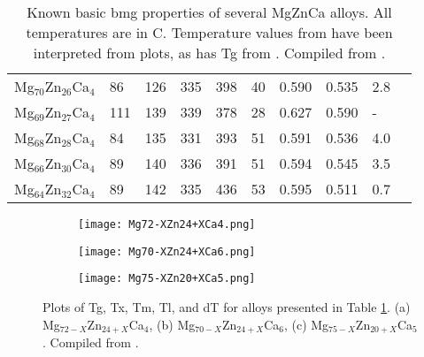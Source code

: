 \documentclass[a4paper,12pt,oneside]{report}%
\begin{document}
\begin{table}[h]
\begin{tabular}{ l l l l l l l l l l }
		Mg$_{70}$Zn$_{26}$Ca$_{4}$ & 86 & 126 & 335 & 398 & 40 & 0.590 & 0.535 & 2.8 & \cite{Cao2013, Cao2012} \\ 
		Mg$_{69}$Zn$_{27}$Ca$_{4}$ & 111 & 139 & 339 & 378 & 28 & 0.627 & 0.590 & - & \cite{Wang2013} \\ 
		Mg$_{68}$Zn$_{28}$Ca$_{4}$ & 84 & 135 & 331 & 393 & 51 & 0.591 & 0.536 & 4.0 & \cite{Cao2013, Cao2012} \\ 
		Mg$_{66}$Zn$_{30}$Ca$_{4}$ & 89 & 140 & 336 & 391 & 51 & 0.594 & 0.545 & 3.5 & \cite{Cao2013, Cao2012} \\ 
		Mg$_{64}$Zn$_{32}$Ca$_{4}$ & 89 & 142 & 335 & 436 & 53 & 0.595 & 0.511 & 0.7 & \cite{Cao2013, Cao2012} \\
		\bottomrule 
	\end{tabular}
	\caption[Known basic \acrshort{bmg} properties of several MgZnCa alloys. All temperatures are in \degree C.]{Known basic \acrshort{bmg} properties of several MgZnCa alloys. All temperatures are in \degree C. Temperature values from \cite{Gu2005} have been interpreted from plots, as has \acrshort{Tg} from \cite{Wang2013}. Compiled from \cite{Cao2013, Gu2005, Zhou2013, Cao2012, Wang2013}.}
	\label{tab:MgZnCaAlloys}
\end{table}

\begin{figure}[htb]
	\centering
	\begin{subfigure}[htbp]{0.49\textwidth}
		\texttt{[image: Mg72-XZn24+XCa4.png]}
		\caption{}
		\label{fig:Mg72xZn24xCa4}
	\end{subfigure}
	\begin{subfigure}[htbp]{0.49\textwidth}
		\texttt{[image: Mg70-XZn24+XCa6.png]}
		\caption{}
		\label{fig:Mg70xZn24xCa6}
	\end{subfigure}
	\begin{subfigure}[htbp]{0.49\textwidth}
		\texttt{[image: Mg75-XZn20+XCa5.png]}
		\caption{}
		\label{fig:Mg75xZn20xCa5}
	\end{subfigure}
	\caption[Plots of \acrshort{Tg}, \acrshort{Tx}, \acrshort{Tm}, \acrshort{Tl}, and \acrshort{dT} for alloys presented in Table \ref{tab:MgZnCaAlloys}. (a) Mg$_{72-X}$Zn$_{24+X}$Ca$_{4}$, (b) Mg$_{70-X}$Zn$_{24+X}$Ca$_{6}$, (c) Mg$_{75-X}$Zn$_{20+X}$Ca$_{5}$.]{Plots of \acrshort{Tg}, \acrshort{Tx}, \acrshort{Tm}, \acrshort{Tl}, and \acrshort{dT} for alloys presented in Table \ref{tab:MgZnCaAlloys}. (a) Mg$_{72-X}$Zn$_{24+X}$Ca$_{4}$, (b) Mg$_{70-X}$Zn$_{24+X}$Ca$_{6}$, (c) Mg$_{75-X}$Zn$_{20+X}$Ca$_{5}$. Compiled from \cite{Cao2013, Gu2005, Zhou2013, Cao2012, Wang2013}.}%
	\label{fig:MgZnCaPlots}
\end{figure}

\newpage


\printglossaries
\end{document}
